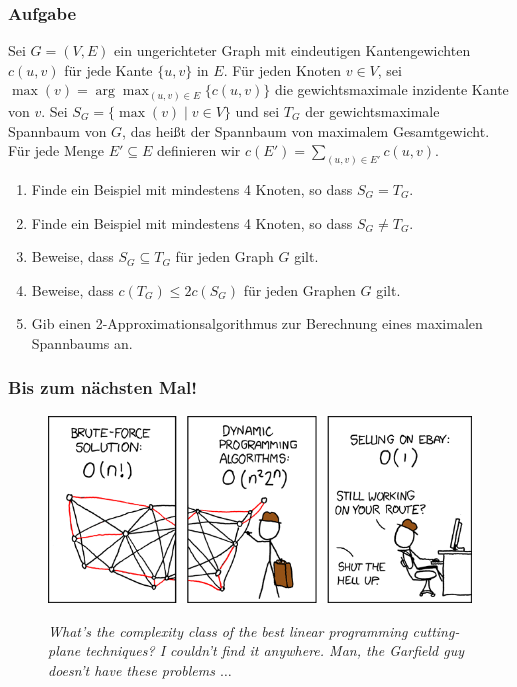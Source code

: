 \begin{frame}
	\frametitle{Aufgabe}
	
	Sei $G=(V,E)$ ein ungerichteter Graph mit eindeutigen Kantengewichten $c(u,v)$ für jede Kante $\{u,v\}$ in $E$.
Für jeden Knoten $v \in V$, sei $\max(v)=\arg\max_{(u,v)\in E}\{c(u,v)\}$ die gewichtsmaximale inzidente Kante von $v$.
Sei $S_G=\{\max(v) \mid v \in V\}$ und sei $T_G$ der gewichtsmaximale Spannbaum von $G$, das heißt der Spannbaum von maximalem Gesamtgewicht.
Für jede Menge $E' \subseteq E$ definieren wir $c(E')=\sum_{(u,v)\in E'}c(u,v)$.
\begin{enumerate}
 \item Finde ein Beispiel mit mindestens 4 Knoten, so dass $S_G=T_G$.
 \item Finde ein Beispiel mit mindestens 4 Knoten, so dass $S_G\not=T_G$.
 \item Beweise, dass $S_G\subseteq T_G$ für jeden Graph $G$ gilt.
 \item Beweise, dass $c(T_G)\leq 2c(S_G)$ für jeden Graphen $G$ gilt.
 \item Gib einen 2-Approximationsalgorithmus zur Berechnung eines maximalen Spannbaums an.
\end{enumerate}
\end{frame}

\begin{frame}
	\frametitle{Bis zum nächsten Mal!}
	
	\begin{figure}[H]
		\includegraphics[width= \textwidth]{images/399_traveling_salesman}
		
		\textit{\scriptsize{What's the complexity class of the best linear programming cutting-plane techniques? I couldn't find it anywhere. Man, the Garfield guy doesn't have these problems $\ldots$}}
		
	\end{figure}
\end{frame}


